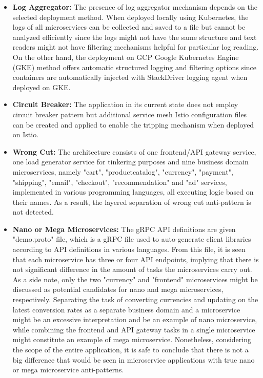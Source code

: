 \documentclass{Configuration_Files/PoliMi3i_thesis}
\begin{document}
\begin{itemize}
    \item \textbf{Log Aggregator:} The presence of log aggregator mechanism depends on the selected deployment method.
    When deployed locally using Kubernetes, the logs of all microservices can be collected and saved to a file but cannot be analyzed efficiently since the logs might not have the same structure and text readers might not have filtering mechanisms helpful for particular log reading.
    On the other hand, the deployment on GCP Google Kubernetes Engine (GKE) method offers automatic structured logging and filtering options since containers are automatically injected with StackDriver logging agent when deployed on GKE.
    
    \item \textbf{Circuit Breaker:} The application in its current state does not employ circuit breaker pattern but additional service mesh Istio configuration files can be created and applied to enable the tripping mechanism when deployed on Istio.
    
    \item \textbf{Wrong Cut:} The architecture consists of one frontend/API gateway service, one load generator service for tinkering purposes and nine business domain microservices, namely "cart", "productcatalog", "currency", "payment", "shipping", "email", "checkout", "recommendation" and "ad" services, implemented in various programming languages, all executing logic based on their names.
    As a result, the layered separation of wrong cut anti-pattern is not detected.
    
    \item \textbf{Nano or Mega Microservices:} The gRPC API definitions are given "demo.proto" file, which is a gRPC file used to auto-generate client libraries according to API definitions in various languages.
    From this file, it is seen that each microservice has three or four API endpoints, implying that there is not significant difference in the amount of tasks the microservices carry out.
    As a side note, only the two "currency" and "frontend" microservices might be discussed as potential candidates for nano and mega microservices, respectively.
    Separating the task of converting currencies and updating on the latest conversion rates as a separate business domain and a microservice might be an excessive interpretation and be an example of nano microservice, while combining the frontend and API gateway tasks in a single microservice might constitute an example of mega microservice.
    Nonetheless, considering the scope of the entire application, it is safe to conclude that there is not a big difference that would be seen in microservice applications with true nano or mega microservice anti-patterns.
    

\end{itemize}
\end{document}

